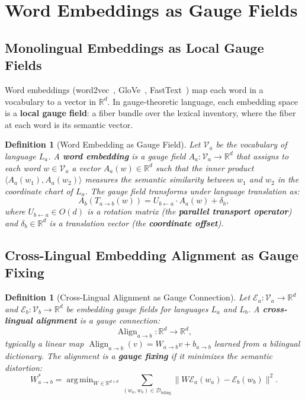 \documentclass[12pt,a4paper]{article}
\newtheorem{definition}[theorem]{Definition}
\theoremstyle{remark}
\newcommand{\R}{\mathbb{R}}
\newcommand{\D}{\mathcal{D}}
\newcommand{\Embed}{\mathcal{E}}
\newcommand{\Vocab}{\mathcal{V}}
\DeclareMathOperator{\argmin}{arg\,min}
\DeclareMathOperator{\Align}{Align}
\begin{document}
\section{Word Embeddings as Gauge Fields}
\label{sec:embeddings}

\subsection{Monolingual Embeddings as Local Gauge Fields}

Word embeddings (word2vec~\cite{mikolov2013distributed}, GloVe~\cite{pennington2014glove},
FastText~\cite{bojanowski2017enriching}) map each word in a vocabulary
to a vector in $\R^d$. In gauge-theoretic language, each embedding
space is a \textbf{local gauge field}: a fiber bundle over the lexical
inventory, where the fiber at each word is its semantic vector.

\begin{definition}[Word Embedding as Gauge Field]
\label{def:embedding_gauge}
Let $\Vocab_a$ be the vocabulary of language $L_a$. A \textbf{word
embedding} is a gauge field $A_a: \Vocab_a \to \R^d$ that assigns
to each word $w \in \Vocab_a$ a vector $A_a(w) \in \R^d$ such that
the inner product $\langle A_a(w_1), A_a(w_2) \rangle$ measures
the semantic similarity between $w_1$ and $w_2$ in the coordinate
chart of $L_a$. The gauge field transforms under language
translation as:
\begin{equation}
  \label{eq:embedding_transform}
  A_b(T_{a\to b}(w)) = U_{b\leftarrow a} \cdot A_a(w) + \delta_b,
\end{equation}
where $U_{b\leftarrow a} \in O(d)$ is a rotation matrix (the
\textbf{parallel transport operator}) and $\delta_b \in \R^d$
is a translation vector (the \textbf{coordinate offset}).
\end{definition}

\subsection{Cross-Lingual Embedding Alignment as Gauge Fixing}

\begin{definition}[Cross-Lingual Alignment as Gauge Connection]
\label{def:alignment_gauge}
Let $\Embed_a: \Vocab_a \to \R^d$ and $\Embed_b: \Vocab_b \to \R^d$
be embedding gauge fields for languages $L_a$ and $L_b$. A
\textbf{cross-lingual alignment} is a gauge connection:
\begin{equation}
  \Align_{a\to b}: \R^d \to \R^d,
\end{equation}
typically a linear map $\Align_{a\to b}(v) = W_{a\to b} v + b_{a\to b}$
learned from a bilingual dictionary. The alignment is a \textbf{gauge
fixing} if it minimizes the semantic distortion:
\begin{equation}
  \label{eq:alignment_gauge_fixing}
  W_{a\to b}^* = \argmin_{W \in \R^{d\times d}} \sum_{(w_a, w_b) \in \D_{\text{biling}}}
    \|W \Embed_a(w_a) - \Embed_b(w_b)\|^2.
\end{equation}
\end{definition}
\end{document}
